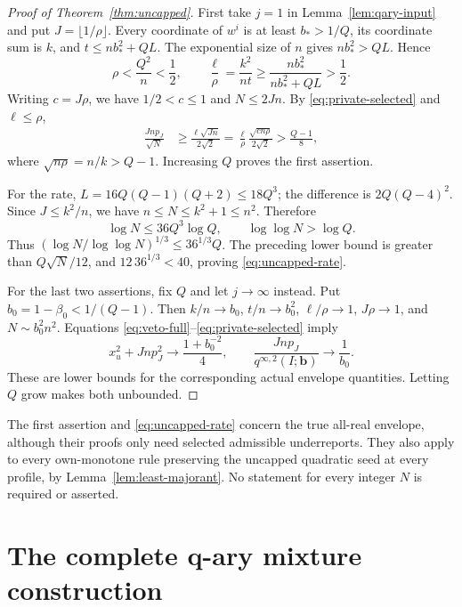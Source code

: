 \begin{proof}[Proof of Theorem~\ref{thm:uncapped}]
First take $j=1$ in Lemma~\ref{lem:qary-input} and put
$J=\lfloor1/\rho\rfloor$.  Every coordinate of $w^i$ is at least
$b_*>1/Q$, its coordinate sum is $k$, and
$t\le nb_*^2+QL$.  The exponential size of $n$ gives
$nb_*^2>QL$.  Hence
\[
 \rho<\frac{Q^2}{n}<\frac12,
 \qquad
 \frac\ell\rho=\frac{k^2}{nt}
       \ge\frac{nb_*^2}{nb_*^2+QL}>\frac12.
\]
Writing $c=J\rho$, we have $1/2<c\le1$ and $N\le2Jn$.  By
\eqref{eq:private-selected} and $\ell\le\rho$,
\begin{align*}
 \frac{Jn p_J}{\sqrt N}
 &\ge\frac{\ell\sqrt{Jn}}{2\sqrt2}
  =\frac{\ell}{\rho}\frac{\sqrt{c n\rho}}{2\sqrt2}
  >\frac{Q-1}{8},
\end{align*}
where $\sqrt{n\rho}=n/k>Q-1$.  Increasing $Q$ proves the first assertion.

For the rate, $L=16Q(Q-1)(Q+2)\le18Q^3$; the difference is
$2Q(Q-4)^2$.  Since $J\le k^2/n$, we have $n\le N\le k^2+1\le n^2$.
Therefore
\[
 \log N\le36Q^3\log Q,
 \qquad \log\log N>\log Q.
\]
Thus $(\log N/\log\log N)^{1/3}\le36^{1/3}Q$.
The preceding lower bound is greater than $Q\sqrt N/12$, and
$12\,36^{1/3}<40$, proving \eqref{eq:uncapped-rate}.

For the last two assertions, fix $Q$ and let $j\to\infty$ instead.
Put $b_0=1-\beta_0<1/(Q-1)$.  Then
$k/n\to b_0$, $t/n\to b_0^2$, $\ell/\rho\to1$,
$J\rho\to1$, and $N\sim b_0^2n^2$.  Equations
\eqref{eq:veto-full}--\eqref{eq:private-selected} imply
\[
 x_u^2+Jn p_J^2\longrightarrow\frac{1+b_0^{-2}}4,
 \qquad
 \frac{Jn p_J}{q^{\infty,2}(I;\mathbf b)}\longrightarrow\frac1{b_0}.
\]
These are lower bounds for the corresponding actual envelope quantities.
Letting $Q$ grow makes both unbounded.
\end{proof}

The first assertion and \eqref{eq:uncapped-rate} concern the true
all-real envelope, although their proofs only need selected admissible
underreports.  They also apply to every own-monotone rule preserving
the uncapped quadratic seed at every profile, by
Lemma~\ref{lem:least-majorant}.  No statement for every integer $N$ is
required or asserted.

\appendix
\section{The complete q-ary mixture construction}
\label{app:qary}

